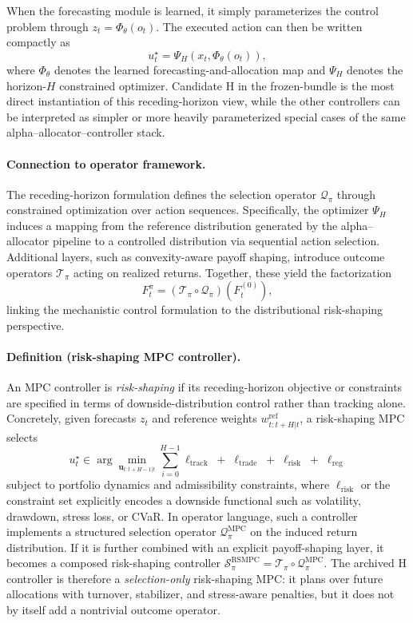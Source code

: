 \documentclass[10pt,twocolumn]{article}
\begin{document}
When the forecasting module is learned, it simply parameterizes the control
problem through $z_t = \Phi_{\theta}(o_t)$. The executed action can then be
written compactly as
\[
u_t^{\star} = \Psi_H(x_t, \Phi_{\theta}(o_t)),
\]
where $\Phi_{\theta}$ denotes the learned forecasting-and-allocation map and
$\Psi_H$ denotes the horizon-$H$ constrained optimizer. Candidate H in the
frozen-bundle is the most direct instantiation of this receding-horizon view,
while the other controllers can be interpreted as simpler or more heavily
parameterized special cases of the same alpha--allocator--controller stack.

\paragraph{Connection to operator framework.}
The receding-horizon formulation defines the selection operator
$\mathcal{Q}_{\pi}$ through constrained optimization over action sequences.
Specifically, the optimizer $\Psi_H$ induces a mapping from the reference
distribution generated by the alpha--allocator pipeline to a controlled
distribution via sequential action selection. Additional layers, such as
convexity-aware payoff shaping, introduce outcome operators
$\mathcal{T}_{\pi}$ acting on realized returns. Together, these yield the
factorization
\[
F_t^\pi = (\mathcal{T}_{\pi}\circ\mathcal{Q}_{\pi})(F_t^{(0)}),
\]
linking the mechanistic control formulation to the distributional
risk-shaping perspective.

\paragraph{Definition (risk-shaping MPC controller).}
An MPC controller is \emph{risk-shaping} if its receding-horizon objective or
constraints are specified in terms of downside-distribution control rather than
tracking alone. Concretely, given forecasts $z_t$ and reference weights
$w_{t:t+H|t}^{\mathrm{ref}}$, a risk-shaping MPC selects
\[
u_t^\star \in \arg\min_{\mathbf{u}_{t:t+H-1|t}}
\sum_{i=0}^{H-1}
\ell_{\mathrm{track}}
\;+\;
\ell_{\mathrm{trade}}
\;+\;
\ell_{\mathrm{risk}}
\;+\;
\ell_{\mathrm{reg}}
\]
subject to portfolio dynamics and admissibility constraints, where
$\ell_{\mathrm{risk}}$ or the constraint set explicitly encodes a downside
functional such as volatility, drawdown, stress loss, or CVaR. In operator
language, such a controller implements a structured selection operator
$\mathcal{Q}_{\pi}^{\mathrm{MPC}}$ on the induced return distribution. If it
is further combined with an explicit payoff-shaping layer, it becomes a
composed risk-shaping controller
$\mathcal{S}_{\pi}^{\mathrm{RSMPC}}
= \mathcal{T}_{\pi}\circ\mathcal{Q}_{\pi}^{\mathrm{MPC}}$.
The archived H controller is therefore a \emph{selection-only} risk-shaping
MPC: it plans over future allocations with turnover, stabilizer, and
stress-aware penalties, but it does not by itself add a nontrivial outcome
operator.
\end{document}
